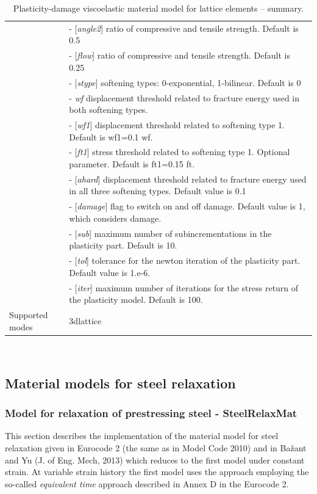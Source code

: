 \documentclass[a4paper]{article}
\newcommand{\param}[1]{{\it #1}}
\newcommand{\optparam}[1]{[{\it #1}]}
\newenvironment{mmt}{\begin{tabular}{|l|p{9cm}|}}{\end{tabular}\\}
\newenvironment{mmt}{\begin{tabular}{|l|l|}}{\end{tabular}\\}
\begin{document}
\begin{table}[!htb]
\begin{mmt}
&- \optparam{angle2} ratio of compressive and tensile strength. Default is 0.5\\
&- \optparam{flow} ratio of compressive and tensile strength. Default is 0.25\\
&- \optparam{stype} softening types: 0-exponential, 1-bilinear. Default is 0\\
&- \param{wf} displacement threshold related to fracture energy used in both softening types.\\
&- \optparam{wf1} displacement threshold related to softening type 1. Default is wf1=0.1 wf.\\
&- \optparam{ft1} stress threshold related to softening type 1. Optional parameter. Default is ft1=0.15 ft.\\
&- \optparam{ahard} displacement threshold related to fracture energy used in all three softening types. Default value is 0.1\\
&- \optparam{damage} flag to switch on and off damage. Default value is 1, which considers damage.\\
&- \optparam{sub} maximum number of subincrementations in the plasticity part. Default is 10.\\
&- \optparam{tol} tolerance for the newton iteration of the plasticity part.  Default value is 1.e-6.\\
&- \optparam{iter} maximum number of iterations for the stress return of the plasticity model. Default is 100.\\
Supported modes & 3dlattice\\
\hline
\end{mmt}
\caption{Plasticity-damage viscoelastic material model for lattice elements -- summary.}
\label{latticeplasticdamageviscoelastic_table}
\end{table}



\subsection{Material models for steel relaxation}

\subsubsection{Model for relaxation of prestressing steel - SteelRelaxMat}
This section describes the implementation of the material model for
steel relaxation given in Eurocode 2 (the same as in Model Code 2010)
and in Ba\v{z}ant and Yu (J. of Eng. Mech, 2013) which reduces to the first model under
constant strain. At variable strain history the first model uses the
approach employing the so-called {\sl{equivalent time}} approach
described in Annex D in the Eurocode 2.
\end{document}
